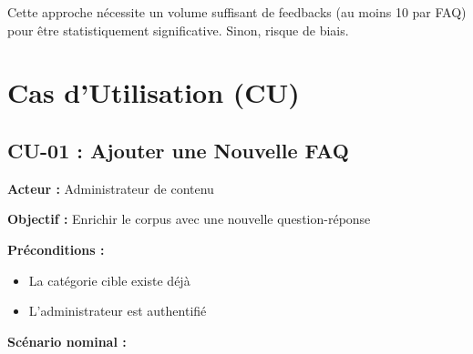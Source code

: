\documentclass[11pt,a4paper]{article}
\begin{document}
\begin{important}[Précaution]
Cette approche nécessite un volume suffisant de feedbacks (au moins 10 par FAQ) pour être statistiquement significative. Sinon, risque de biais.
\end{important}



\clearpage

\section{Cas d'Utilisation (CU)}
\label{sec:cas_utilisation}

\subsection{CU-01 : Ajouter une Nouvelle FAQ}

\textbf{Acteur :} Administrateur de contenu

\textbf{Objectif :} Enrichir le corpus avec une nouvelle question-réponse

\textbf{Préconditions :}
\begin{itemize}
    \item La catégorie cible existe déjà
    \item L'administrateur est authentifié
\end{itemize}

\textbf{Scénario nominal :}
\end{document}
